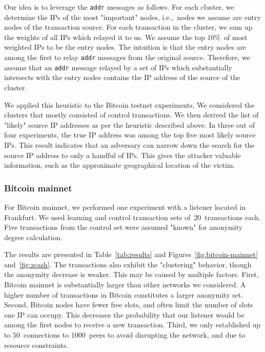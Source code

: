 Our idea is to leverage the \texttt{addr} messages as follows.
For each cluster, we determine the IPs of the most "important" nodes, i.e.,~nodes we assume are entry nodes of the transaction source.
For each transaction in the cluster, we sum up the weights of all IPs which relayed it to us.
We assume the top $10\%$~of most weighted IPs to be the entry nodes.
The intuition is that the entry nodes are among the first to relay \texttt{addr} messages from the original source.
Therefore, we assume that an \texttt{addr} message relayed by a set of IPs which substantially intersects with the entry nodes contains the IP address of the source of the cluster.

We applied this heuristic to the Bitcoin testnet experiments.
We considered the clusters that mostly consisted of control transactions.
We then derived the list of "likely" source IP addresses as per the heuristic described above.
In three out of four experiments, the true IP address was among the top five most likely source IPs.
This result indicates that an adversary can narrow down the search for the source IP address to only a handful of IPs.
This gives the attacker valuable information, such as the approximate geographical location of the victim.

\subsubsection{Bitcoin mainnet}

For Bitcoin mainnet, we performed one experiment with a listener located in Frankfurt.
We used learning and control transaction sets of~$20$~transactions each.
Five transactions from the control set were assumed "known" for anonymity degree calculation.

The results are presented in Table~\ref{tab:results} and Figures~\ref{fig:bitcoin-mainnet} and~\ref{fig:zcash}.
The transactions also exhibit the "clustering" behavior, though the anonymity decrease is weaker.
This may be caused by multiple factors.
First, Bitcoin mainnet is substantially larger than other networks we considered.
A higher number of transactions in Bitcoin constitutes a larger anonymity set.
Second, Bitcoin nodes have fewer free slots, and often limit the number of slots one IP can occupy.
This decreases the probability that our listener would be among the first nodes to receive a new transaction.
Third, we only established up to $50$~connections to $1000$~peers to avoid disrupting the network, and due to resource constraints.

